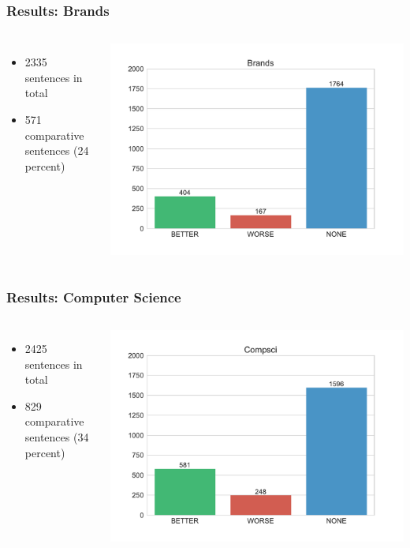\documentclass[11pt,aspectratio=169,usenames,dvipsnames]{beamer}
\begin{document}
    \begin{frame}
        \frametitle{Results: Brands}
        \begin{columns}
            \column{2in}
            \begin{itemize}
                \item 2335 sentences in total
                \item 571 comparative sentences (24 percent)
            \end{itemize}
            \column{3in}
            \includegraphics[scale=0.45,trim={1cm 0 2cm 1cm},clip]{images/Brands-dist}
        \end{columns}
    \end{frame}

    \begin{frame}[t]
        \frametitle{Results: Computer Science}
        \begin{columns}
            \column{2in}
            \begin{itemize}
                \item 2425 sentences in total
                \item 829 comparative sentences (34 percent)
            \end{itemize}
            \column{3in}
            \includegraphics[scale=0.45,trim={1cm 0 2cm 1cm},clip]{images/Compsci-dist.pdf}
        \end{columns}
    \end{frame}
\end{document}
